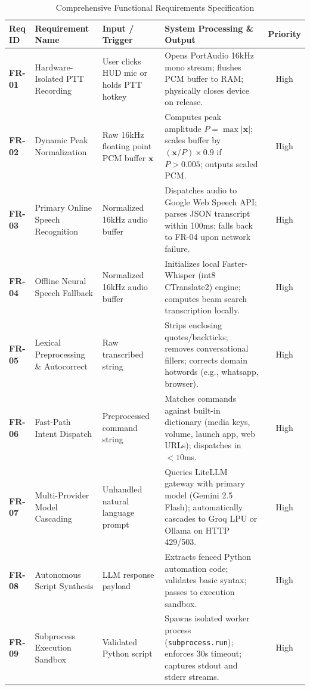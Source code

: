 \begin{table}[htbp]
\centering
\scriptsize
\caption{Comprehensive Functional Requirements Specification}
\label{tab:functional_requirements}
\begin{tabularx}{\textwidth}{|l|p{2.8cm}|p{3.2cm}|X|c|}
\hline
\textbf{Req ID} & \textbf{Requirement Name} & \textbf{Input / Trigger} & \textbf{System Processing \& Output} & \textbf{Priority} \\ \hline
\textbf{FR-01} & Hardware-Isolated PTT Recording & User clicks HUD mic or holds PTT hotkey & Opens PortAudio 16kHz mono stream; flushes PCM buffer to RAM; physically closes device on release. & High \\ \hline
\textbf{FR-02} & Dynamic Peak Normalization & Raw 16kHz floating point PCM buffer $\mathbf{x}$ & Computes peak amplitude $P = \max |\mathbf{x}|$; scales buffer by $(\mathbf{x}/P) \times 0.9$ if $P > 0.005$; outputs scaled PCM. & High \\ \hline
\textbf{FR-03} & Primary Online Speech Recognition & Normalized 16kHz audio buffer & Dispatches audio to Google Web Speech API; parses JSON transcript within 100ms; falls back to FR-04 upon network failure. & High \\ \hline
\textbf{FR-04} & Offline Neural Speech Fallback & Normalized 16kHz audio buffer & Initializes local Faster-Whisper (int8 CTranslate2) engine; computes beam search transcription locally. & High \\ \hline
\textbf{FR-05} & Lexical Preprocessing \& Autocorrect & Raw transcribed string & Strips enclosing quotes/backticks; removes conversational fillers; corrects domain hotwords (e.g., whatsapp, browser). & High \\ \hline
\textbf{FR-06} & Fast-Path Intent Dispatch & Preprocessed command string & Matches commands against built-in dictionary (media keys, volume, launch app, web URLs); dispatches in $<10$ms. & High \\ \hline
\textbf{FR-07} & Multi-Provider Model Cascading & Unhandled natural language prompt & Queries LiteLLM gateway with primary model (Gemini 2.5 Flash); automatically cascades to Groq LPU or Ollama on HTTP 429/503. & High \\ \hline
\textbf{FR-08} & Autonomous Script Synthesis & LLM response payload & Extracts fenced Python automation code; validates basic syntax; passes to execution sandbox. & High \\ \hline
\textbf{FR-09} & Subprocess Execution Sandbox & Validated Python script & Spawns isolated worker process (\texttt{subprocess.run}); enforces 30s timeout; captures stdout and stderr streams. & High \\ \hline

\end{tabularx}
\end{table}

